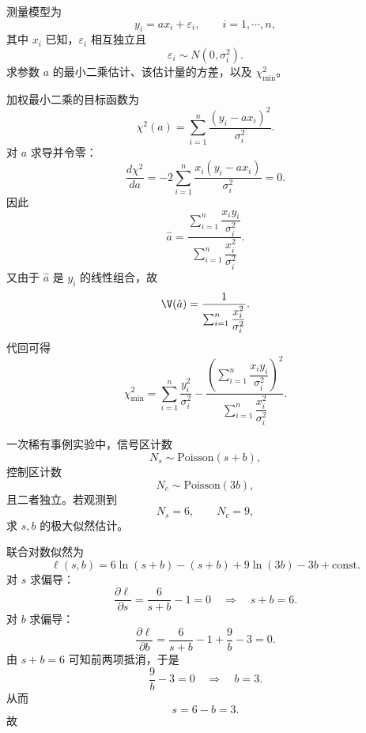 \begin{question}
测量模型为
\[
y_i=ax_i+\varepsilon_i,\qquad i=1,\cdots,n,
\]
其中 $x_i$ 已知，$\varepsilon_i$ 相互独立且
\[
\varepsilon_i\sim N(0,\sigma_i^2).
\]
求参数 $a$ 的最小二乘估计、该估计量的方差，以及 $\chi^2_{\min}$。
\begin{solution}
加权最小二乘的目标函数为
\[
\chi^2(a)=\sum_{i=1}^n \frac{(y_i-ax_i)^2}{\sigma_i^2}.
\]
对 $a$ 求导并令零：
\[
\frac{d\chi^2}{da}=-2\sum_{i=1}^n \frac{x_i(y_i-ax_i)}{\sigma_i^2}=0.
\]
因此
\[
\hat a=\frac{\sum_{i=1}^n \dfrac{x_i y_i}{\sigma_i^2}}
{\sum_{i=1}^n \dfrac{x_i^2}{\sigma_i^2}}.
\]
又由于 $\hat a$ 是 $y_i$ 的线性组合，故
\[
\V(\hat a)=\frac{1}{\sum_{i=1}^n \dfrac{x_i^2}{\sigma_i^2}}.
\]
代回可得
\[
\chi^2_{\min}
=\sum_{i=1}^n \frac{y_i^2}{\sigma_i^2}
-\frac{\left(\sum_{i=1}^n \dfrac{x_i y_i}{\sigma_i^2}\right)^2}
{\sum_{i=1}^n \dfrac{x_i^2}{\sigma_i^2}}.
\]
\end{solution}
\end{question}

\begin{question}
一次稀有事例实验中，信号区计数
\[
N_s\sim \mathrm{Poisson}(s+b),
\]
控制区计数
\[
N_c\sim \mathrm{Poisson}(3b),
\]
且二者独立。若观测到
\[
N_s=6,\qquad N_c=9,
\]
求 $s,b$ 的极大似然估计。
\begin{solution}
联合对数似然为
\[
\ell(s,b)=6\ln(s+b)-(s+b)+9\ln(3b)-3b+\text{const}.
\]
对 $s$ 求偏导：
\[
\frac{\partial \ell}{\partial s}=\frac{6}{s+b}-1=0
\quad\Longrightarrow\quad
s+b=6.
\]
对 $b$ 求偏导：
\[
\frac{\partial \ell}{\partial b}=\frac{6}{s+b}-1+\frac{9}{b}-3=0.
\]
由 $s+b=6$ 可知前两项抵消，于是
\[
\frac{9}{b}-3=0\quad\Longrightarrow\quad b=3.
\]
从而
\[
s=6-b=3.
\]
故
\end{solution}
\end{question}

